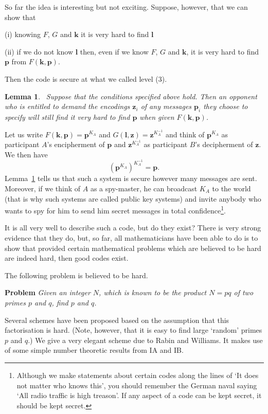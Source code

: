 \documentclass[12pt,a4paper]{article}
\theoremstyle{plain}
\newtheorem{lemma}[theorem]{Lemma}
\theoremstyle{definition}
\begin{document}
So far the idea is interesting but not exciting.
Suppose, however, that we can show that

(i) knowing $F$, $G$ and $\mathbf k$ 
it is very hard to find ${\mathbf l}$

(ii) if we do not know ${\mathbf l}$ then, even if we know $F$, $G$
and ${\mathbf k}$, it is very hard to find ${\mathbf p}$
from $F({\mathbf k},{\mathbf p})$.

\noindent
Then the code is secure at what we called level (3).
\begin{lemma}~\label{level 3}
Suppose that the conditions specified
above hold. Then an opponent who is entitled to
demand the encodings ${\mathbf z}_{i}$ of
any messages ${\mathbf p}_{i}$ they choose
to specify will still find it very hard to find
$\mathbf{p}$ when given
$F({\mathbf k},{\mathbf p})$.
\end{lemma}

Let us write $F({\mathbf k},{\mathbf p})={\mathbf p}^{K_{A}}$
and $G({\mathbf l},{\mathbf z})={\mathbf z}^{K_{A}^{-1}}$
and think of ${\mathbf p}^{K_{A}}$ as participant
$A$'s encipherment of $\mathbf{p}$ and
${\mathbf z}^{K_{A}^{-1}}$ as participant $B$'s
decipherment of ${\mathbf z}$. We then have
\[({\mathbf p}^{K_{A}})^{K_{A}^{-1}}={\mathbf p}.\]
Lemma~\ref{level 3} tells us that such a system
is secure however many messages are sent.
Moreover, if we think of $A$ as a spy-master,
he can broadcast $K_{A}$ to the world (that
is why such systems are called public key
systems) and invite anybody who
wants to spy for him to send him secret messages
in total confidence\footnote{Although we
make statements about certain codes along the lines
of `It does not matter who knows this', you
should remember the German naval saying
`All radio traffic is high treason'. If 
any aspect of a code can be
kept secret, it should be kept secret.}.

It is all very well to describe such a code,
but do they exist? There is very strong evidence
that they do, but, so far, all mathematicians
have been able to do is to show that
provided certain mathematical problems which
are believed to be hard are indeed hard,
then good codes exist.

The following problem is believed to be hard.

\noindent
{\bf Problem} \emph{Given an integer $N$, which is
known to be the product $N=pq$ of two primes
$p$ and $q$, find $p$ and $q$.}

\noindent
Several schemes have been proposed based on the
assumption that this factorisation is hard.
(Note, however, that it is easy to find large `random'
primes $p$ and $q$.) We give a very elegant
scheme due to Rabin and Williams. It makes use
of some simple number theoretic
results from IA and IB.
\end{document}
